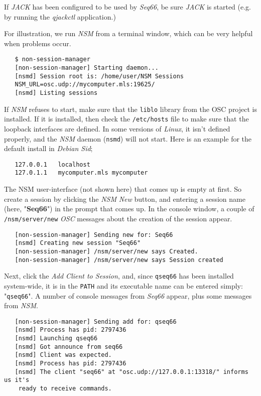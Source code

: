    If \textsl{JACK} has been configured to be
   used by \textsl{Seq66}, be sure \textsl{JACK} is started (e.g. by running
   the \textsl{qjackctl} application.)

   For illustration, we run \textsl{NSM} from a terminal window, which can be
   very helpful when problems occur.

\begin{verbatim}
   $ non-session-manager
   [non-session-manager] Starting daemon...
   [nsmd] Session root is: /home/user/NSM Sessions
   NSM_URL=osc.udp://mycomputer.mls:19625/
   [nsmd] Listing sessions
\end{verbatim}

   If \textsl{NSM} refuses to start, make sure that the \texttt{liblo} library
   from the OSC project is installed.  If it is installed, then check the
   \texttt{/etc/hosts} file to make sure that the loopback interfaces are
   defined. In some versions of \textsl{Linux}, it isn't defined properly,
   and the \textsl{NSM} daemon (\texttt{nsmd}) will not start.
   Here is an example for the default install in \textsl{Debian Sid};

\begin{verbatim}
   127.0.0.1   localhost
   127.0.1.1   mycomputer.mls mycomputer
\end{verbatim}

   The NSM user-interface (not shown here) that comes up is empty at first.
   So create a session by clicking the \textsl{NSM}
   \textsl{New} button, and entering a session name
   (here, "\textbf{Seq66}") in the
   prompt that comes up.  In the console window, a couple of 
   \texttt{/nsm/server/new} \textsl{OSC} messages
   about the creation of the session appear.

\begin{verbatim}
   [non-session-manager] Sending new for: Seq66
   [nsmd] Creating new session "Seq66"
   [non-session-manager] /nsm/server/new says Created.
   [non-session-manager] /nsm/server/new says Session created
\end{verbatim}

   Next, click the \textsl{Add Client to Session}, and, since
   \texttt{qseq66} has been installed system-wide, it is in the \texttt{PATH}
   and its executable name can be entered simply: "\texttt{qseq66}".
   A number of console messages from
   \textsl{Seq66} appear, plus some messages from \textsl{NSM}.

\begin{verbatim}
   [non-session-manager] Sending add for: qseq66
   [nsmd] Process has pid: 2797436
   [nsmd] Launching qseq66
   [nsmd] Got announce from seq66
   [nsmd] Client was expected.
   [nsmd] Process has pid: 2797436
   [nsmd] The client "seq66" at "osc.udp://127.0.0.1:13318/" informs us it's
    ready to receive commands.
\end{verbatim}


